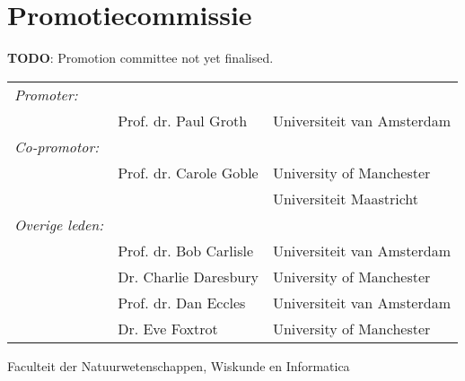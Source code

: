 \newpage

\section*{Promotiecommissie}

\textbf{TODO}: Promotion committee not yet finalised.

\begin{tabular}{lll}
\textit{Promoter:}  &  & \\
     & Prof. dr. Paul Groth     & Universiteit van Amsterdam \\
\textit{Co-promotor:} & & \\     
     &  Prof. dr. Carole Goble       & University of Manchester \\
     &                          & Universiteit Maastricht \\
\textit{Overige leden:} & & \\
     &  Prof.   dr. Bob Carlisle   & Universiteit van Amsterdam \\
     &  Dr. Charlie Daresbury   & University of Manchester  \\     
     &  Prof. dr. Dan Eccles     & Universiteit van Amsterdam \\
     &  Dr. Eve Foxtrot         & University of Manchester  \\     
\end{tabular}

Faculteit der Natuurwetenschappen, Wiskunde en Informatica
